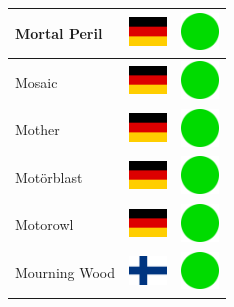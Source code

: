\documentclass[12pt, a4paper, twoside]{report}
\begin{document}
\begin{center}
\begin{longtable}{|p{5cm}|p{2cm}|p{2cm}|}
 Mortal Peril                                               & \includegraphics[width=1cm]{../img/flags/de} &   \includegraphics[width=1cm]{../likes/y} \\ \hline
 Mosaic                                                     & \includegraphics[width=1cm]{../img/flags/de} &   \includegraphics[width=1cm]{../likes/y} \\ \hline
 Mother                                                     & \includegraphics[width=1cm]{../img/flags/de} &   \includegraphics[width=1cm]{../likes/y} \\ \hline
 Motörblast                                                 & \includegraphics[width=1cm]{../img/flags/de} &   \includegraphics[width=1cm]{../likes/y} \\ \hline
 Motorowl                                                   & \includegraphics[width=1cm]{../img/flags/de} &   \includegraphics[width=1cm]{../likes/y} \\ \hline
 Mourning Wood                                              & \includegraphics[width=1cm]{../img/flags/fi} &   \includegraphics[width=1cm]{../likes/y} \\ \hline

\end{longtable}
\end{center}
\end{document}
